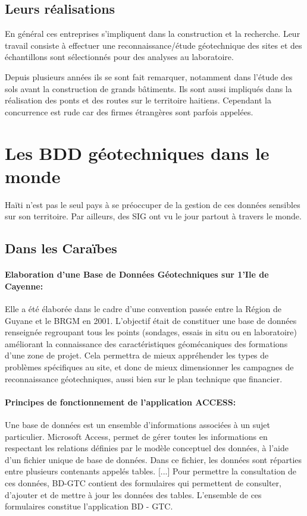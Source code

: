         
        \subsection{Leurs réalisations}
        En général ces entreprises s'impliquent dans la construction et la recherche. 
        Leur travail consiste à effectuer une reconnaissance/étude géotechnique des sites et des échantillons  sont sélectionnés pour des analyses au
        laboratoire.
        \par
        Depuis plusieurs années ils se sont fait remarquer, notamment dans
         l'étude des sols avant la construction de grands bâtiments. Ils sont aussi impliqués dans la réalisation des ponts et des routes sur le territoire
          haitiens. Cependant la concurrence est rude car des firmes étrangères sont parfois appelées. 
     
     
     
          \section{Les BDD géotechniques dans le monde}
        Haïti n’est pas le seul pays à se préoccuper de la gestion de ces données sensibles sur son territoire. Par ailleurs, des SIG ont vu le jour partout à travers le monde.
        \subsection{Dans les Caraïbes}
        \paragraph{Elaboration d'une Base de Données Géotechniques
        sur 1'Ile de Cayenne: }
        Elle a été élaborée dans le cadre d'une convention passée entre la
        Région de Guyane et le BRGM en 2001.
        \cite{Cayenne}
         L'objectif était de constituer une base de données renseignée regroupant tous les points (sondages, essais
        in situ ou en laboratoire) améliorant la connaissance des caractéristiques géomécaniques des
        formations d'une zone de projet. Cela permettra de mieux appréhender les types de problèmes
        spécifiques au site, et donc de mieux dimensionner les campagnes de reconnaissance
        géotechniques, aussi bien sur le plan technique que financier.
       \paragraph{ Principes de fonctionnement de l'application ACCESS: }
       Une base de données est un ensemble d'informations associées à un sujet particulier.
        Microsoft Access, permet de gérer toutes les informations en respectant les relations définies
        par le modèle conceptuel des données, à l'aide d'un fichier unique de base de données. Dans
        ce fichier, les données sont réparties entre plusieurs contenants appelés tables. [...]
        Pour permettre la consultation de ces données, BD-GTC contient des formulaires qui
        permettent de consulter, d'ajouter et de mettre à jour les données des tables. L'ensemble de ces
        formulaires constitue l'application BD - GTC.
        \cite{Cayenne}

